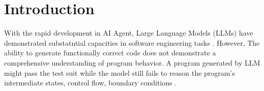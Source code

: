 \section{Introduction}
\label{sec:introduction}

With the rapid development in AI Agent, Large Language Models (LLMs) have demonstrated substatntial 
capacities in software engineering tasks \citep{Liu2026LLMAgent}. However, The ability to generate 
functionally correct code does not demonstrate a comprehensive understanding of program behavior. A program generated
by LLM might pass the test suit while the model still fails to reason the program's intermediate states, control flow, boundary
conditions \citep{Chen2025REval}. 
